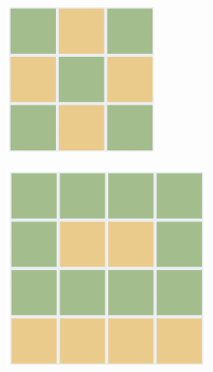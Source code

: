 \documentclass[12pt,twoside]{article}
\begin{document}
\begin{figure}[h]
    \caption{}
    \unsethebrew
    \label{fig:sol_3_4_5}
    \centering
    \begin{subfigure}[b]{.25\linewidth}
    \includegraphics[width=\linewidth]{images/3x3_sol.PNG}
    \end{subfigure}
    \begin{subfigure}[b]{.25\linewidth}
    \includegraphics[width=\linewidth]{images/4x4_sol.PNG}

\end{subfigure}
\end{figure}
\end{document}
